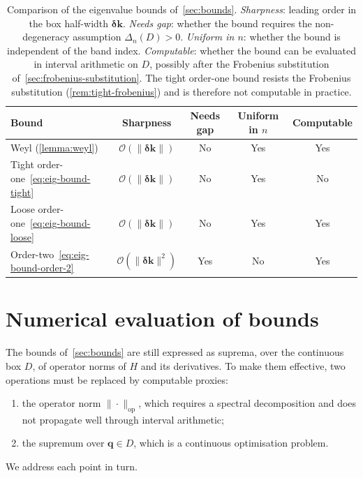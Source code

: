 \documentclass[11pt]{article}
\numberwithin{equation}{section}
\begin{document}
\begin{table}[ht]
    \centering
    \begin{tabular}{l|c|c|c|c}
        \hline
        Bound & Sharpness                                  & Needs gap & Uniform in $n$ & Computable \\
        \hline
        Weyl (\autoref{lemma:weyl})
              & $\mathcal{O}(\|\bm{\delta\mathbf{k}}\|)$
              & No                                         & Yes       & Yes                         \\
        Tight order-one~\eqref{eq:eig-bound-tight}
              & $\mathcal{O}(\|\bm{\delta\mathbf{k}}\|)$
              & No                                         & Yes       & No                          \\
        Loose order-one~\eqref{eq:eig-bound-loose}
              & $\mathcal{O}(\|\bm{\delta\mathbf{k}}\|)$
              & No                                         & Yes       & Yes                         \\
        Order-two~\eqref{eq:eig-bound-order-2}
              & $\mathcal{O}(\|\bm{\delta\mathbf{k}}\|^2)$
              & Yes                                        & No        & Yes                         \\
        \hline
    \end{tabular}
    \caption{Comparison of the eigenvalue bounds of~\autoref{sec:bounds}.
        \emph{Sharpness}: leading order in the box half-width
        \(\bm{\delta\mathbf{k}}\). \emph{Needs gap}: whether the bound requires
        the non-degeneracy assumption \(\Delta_n(D) > 0\). \emph{Uniform in
            \(n\)}: whether the bound is independent of the band index.
        \emph{Computable}: whether the bound can be evaluated in interval
        arithmetic on \(D\), possibly after the Frobenius substitution
        of~\autoref{sec:frobenius-substitution}. The tight order-one bound resists the
        Frobenius substitution (\autoref{rem:tight-frobenius}) and is
        therefore not computable in practice.}
    \label{tab:bounds-comparison}
\end{table}
\section{Numerical evaluation of bounds}\label{sec:numerical-bounds}

The bounds of~\autoref{sec:bounds} are still expressed as suprema, over the
continuous box \(D\), of operator norms of \(H\) and its derivatives. To make
them effective, two operations must be replaced by computable proxies:
\begin{enumerate}
    \item the operator norm \(\|\cdot\|_\mathrm{op}\), which requires a spectral
          decomposition and does not propagate well through interval arithmetic;
    \item the supremum over \(\mathbf{q} \in D\), which is a continuous
          optimisation problem.
\end{enumerate}
We address each point in turn.
\end{document}
